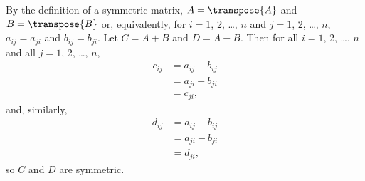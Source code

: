By the definition of a symmetric matrix, $A=\transpose{A}$ and $B=\transpose{B}$ or, equivalently, for $i=1$, 2, \dots, $n$ and $j=1$, 2, \dots, $n$, $a_{ij}=a_{ji}$ and $b_{ij}=b_{ji}$.
Let $C=A+B$ and $D=A-B$.
Then for all $i=1$, 2, \dots, $n$ and all $j=1$, 2, \dots, $n$,
\begin{align*}
    c_{ij} &= a_{ij}+b_{ij} \\
    &= a_{ji}+b_{ji} \\
    &= c_{ji},
\end{align*}
and, similarly,
\begin{align*}
    d_{ij} &= a_{ij}-b_{ij} \\
    &= a_{ji}-b_{ji} \\
    &= d_{ji},
\end{align*}
so $C$ and $D$ are symmetric.
